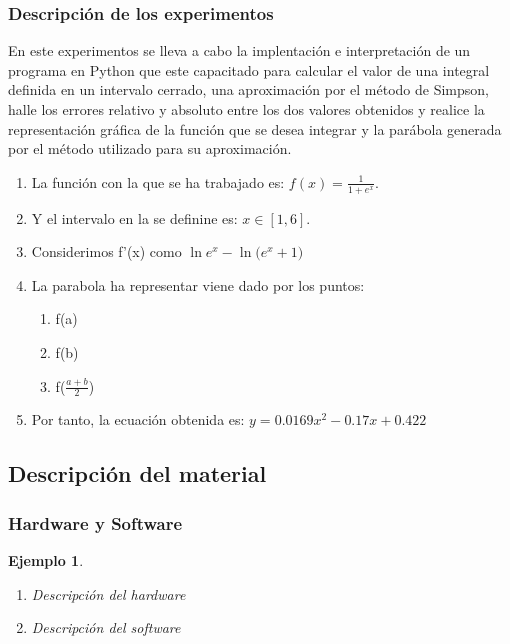 \documentclass{beamer}
\newtheorem{ejemplo}{Ejemplo}
\begin{document}
\begin{frame}
\frametitle{Descripción de los experimentos}
	En este experimentos se lleva a cabo la implentación e interpretación de un programa en Python que
 este capacitado para calcular el valor de una integral definida en un intervalo cerrado, una aproximación por 
 el método de Simpson, halle los errores relativo y absoluto entre los dos valores obtenidos y realice la representación
gráfica de la función que se desea integrar y la parábola generada por el método utilizado
para su aproximación.
 	
 \begin{enumerate}
    \item La función con la que se ha trabajado es: $f(x) = \frac{1}{1+e^{x}}$.
    \pause
    \item Y el intervalo en la se definine es: $x \in [1, 6]$.
    \pause
    \item Considerimos f'(x) como $\ln{e^{x}} - \ln({e^{x}+1)}$
    \pause
    \item La parabola ha representar viene dado por los puntos:
    \begin{enumerate}
      \item f(a)
      \pause
      \item f(b)
      \pause
      \item f($\frac{a+b}{2}$)
    \end{enumerate}
    \pause
    \item Por tanto, la ecuación obtenida es: $y = 0.0169x^2 - 0.17x + 0.422 $
      
 \end{enumerate}
\end{frame}

\subsection{Descripción del material}
\begin{frame}
\frametitle{Hardware y Software}

\begin{ejemplo}
  \begin{enumerate}
    \item
      Descripción del hardware 
      \pause

    \item
      Descripción del software 
  \end{enumerate}
\end{ejemplo}

\end{frame}
\end{document}
